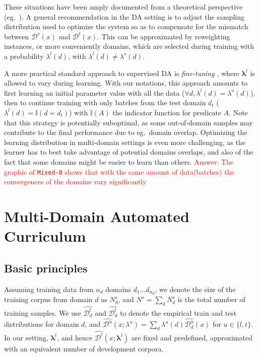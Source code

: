\documentclass[11pt]{article}
\newcommand{\fyTodo}[1]{\Todo[FY:]{\textcolor{orange}{#1}}}
\newcommand{\revision}[1]{\textcolor{red}{#1}}
\newcommand{\system}[1]{\texttt{{#1}}}
\newcommand{\vlambda}{\ensuremath{\boldsymbol\lambda}\xspace} %
\newcommand{\indic}[1]{\ensuremath{\mathbb{I}(#1)}}
\begin{document}
These situations have been amply documented from a theoretical perspective (eg.\ \cite{Mansour09multiple,Mansour09domainadaptation,Hoffman18algorithms}). A general recommendation in the DA setting is to adjust the sampling distribution used to optimize the system so as to compensate for the mismatch between $\mathcal{D}^s(x)$ and $\mathcal{D}^t(x)$. This can be approximated by reweighting instances, or more conveniently domains, which are selected during training with a probability $\lambda^{l}(d)$, with $\lambda^{l}(d) \neq \lambda^{s}(d)$.

A more practical standard approach to supervised DA is \emph{fine-tuning} \cite{Luong15stanford,Freitag16fast}, where $\vlambda^{l}$ is allowed to vary during learning. With our notations, this approach amounts to first learning an initial parameter value with all the data ($\forall d, \lambda^{l}(d) = \lambda^{s}(d)$), then to continue training with only batches from the test domain $d_t$ ($\lambda^{l}(d) = \indic{d = d_t}$) with $\indic{A}$ the indicator function for predicate $A$. Note that this strategy is potentially suboptimal, as some out-of-domain samples may contribute to the final performance due to eg.\ domain overlap. Optimizing the learning distribution in multi-domain settings is even more challenging, as the learner has to best take advantage of potential domains overlaps, and also of the fact that some domains might be easier to learn than others.\fyTodo{How to measure this?} \revision{Answer: The graphic of \system{Mixed-0} shows that with the same amount of data(batches) the convergences of the domains vary significantly}


\section{Multi-Domain Automated Curriculum } \label{sec:mdac}
\subsection{Basic principles}
Assuming training data from $n_d$ domains $d_1 \dots d_{n_d}$, we denote the size of the training corpus from domain $d$ as  $N^{s}_d$, and $N^{s} = \sum_d N^{s}_d$ is the total number of training samples. We use $\widehat{\mathcal{D}^l_d}$ and $\widehat{\mathcal{D}^t _d}$ to denote the empirical train and test distributions for domain $d$, and $\widehat{\mathcal{D}^{u}}(x;\lambda^{u}) = \sum_{d} \lambda^{u}(d) \widehat{\mathcal{D}^{u}_d}(x)$ for $u\in\{l,t\}$. In our setting,  $\vlambda^t$, and hence $\widehat{\mathcal{D}^t}(x;\vlambda^t)$ are fixed and predefined, approximated with an equivalent number of development corpora. 
\end{document}
